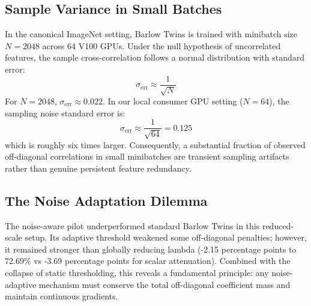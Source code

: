 \documentclass[conference]{IEEEtran}
\begin{document}
\subsection{Sample Variance in Small Batches}
In the canonical ImageNet setting, Barlow Twins is trained with minibatch size $N=2048$ across 64 V100 GPUs. Under the null hypothesis of uncorrelated features, the sample cross-correlation follows a normal distribution with standard error:
\begin{equation}
    \sigma_{\text{err}} \approx \frac{1}{\sqrt{N}}
\end{equation}
For $N=2048$, $\sigma_{\text{err}} \approx 0.022$. In our local consumer GPU setting ($N=64$), the sampling noise standard error is:
\begin{equation}
    \sigma_{\text{err}} \approx \frac{1}{\sqrt{64}} = 0.125
\end{equation}
which is roughly six times larger. Consequently, a substantial fraction of observed off-diagonal correlations in small minibatches are transient sampling artifacts rather than genuine persistent feature redundancy.

\subsection{The Noise Adaptation Dilemma}
The noise-aware pilot underperformed standard Barlow Twins in this reduced-scale setup. Its adaptive threshold weakened some off-diagonal penalties; however, it remained stronger than globally reducing lambda (-2.15 percentage points to 72.69\% vs -3.69 percentage points for scalar attenuation). Combined with the collapse of static thresholding, this reveals a fundamental principle: any noise-adaptive mechanism must conserve the total off-diagonal coefficient mass and maintain continuous gradients.
\end{document}
